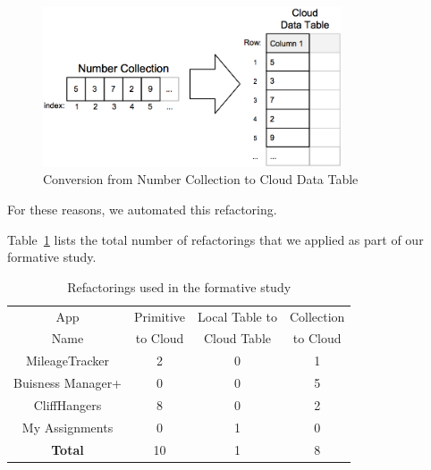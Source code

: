 \documentclass[article]{sigplanconf}
\begin{document}
 \begin{figure}[htbp!]
\begin{center}
\includegraphics[width=250pt]{images/convertCollectionToTable}
\nocaptionrule
\caption{Conversion from Number Collection to Cloud Data Table}
\label{fig:ncToCDT}
\end{center}
\end{figure}


For these reasons, we automated this refactoring. 

Table~\ref{tab:refactoringsFormative} lists the total number of refactorings that we applied as part of our formative study.

\begin{table}[htdp]

\begin{center}
\begin{tabular}{|c|c|c|c|}
\hline
App  & Primitive & Local Table to   & Collection\\
 Name &  to Cloud  &  Cloud Table  & to Cloud \\
\hline
MileageTracker & 2 & 0 & 1\\
\hline
Buisness Manager+ & 0 & 0 & 5\\
\hline
CliffHangers & 8 & 0 & 2\\
\hline
My Assignments & 0 & 1 & 0\\
\hline
\hline
\textbf{Total} & 10 & 1  & 8 \\
\hline
\end{tabular}
\end{center}
\nocaptionrule
\caption{ Refactorings used in the formative study}
\label{tab:refactoringsFormative}
\end{table}%
\end{document}
